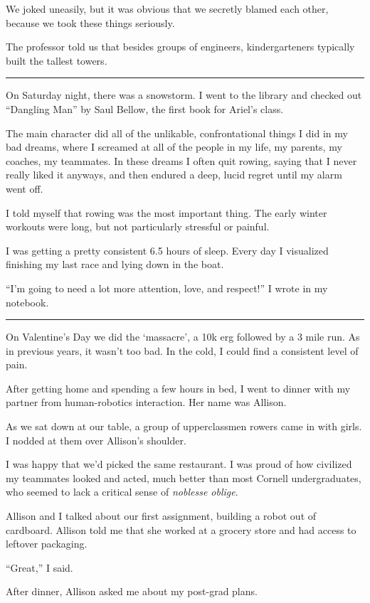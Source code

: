 We joked uneasily, but it was obvious that we secretly blamed each other,
because we took these things seriously.

The professor told us that besides groups of engineers, kindergarteners
typically built the tallest towers.

\plainfancybreak{12pt}{2}{}

On Saturday night, there was a snowstorm.  I went to the library and checked out
``Dangling Man'' by Saul Bellow, the first book for Ariel's class.

The main character did all of the unlikable, confrontational things I did in my
bad dreams, where I screamed at all of the people in my life, my parents, my
coaches, my teammates.  In these dreams I often quit rowing, saying that I never
really liked it anyways, and then endured a deep, lucid regret until my alarm
went off.

I told myself that rowing was the most important thing.  The early winter
workouts were long, but not particularly stressful or painful.  

I was getting a pretty consistent 6.5 hours of sleep.  Every day I visualized
finishing my last race and lying down in the boat.  

``I'm going to need a lot more attention, love, and respect!'' I wrote in my
notebook. 

\plainfancybreak{12pt}{2}{}

On Valentine's Day we did the `massacre', a 10k erg followed by a 3 mile run.
As in previous years, it wasn't too bad.  In the cold, I could find a consistent
level of pain.

After getting home and spending a few hours in bed, I went to dinner with my
partner from human-robotics interaction.  Her name was Allison. 

As we sat down at our table, a group of upperclassmen rowers came in with girls.
I nodded at them over Allison's shoulder.  

I was happy that we'd picked the same restaurant.  I was proud of how civilized
my teammates looked and acted, much better than most Cornell undergraduates, who
seemed to lack a critical sense of \textit{noblesse oblige}.

Allison and I talked about our first assignment, building a robot out of
cardboard.  Allison told me that she worked at a grocery store and had access to
leftover packaging.

``Great,'' I said.

After dinner, Allison asked me about my post-grad plans.  

